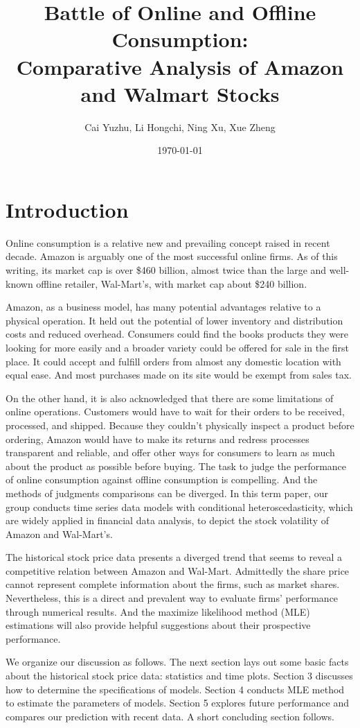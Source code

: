 \documentclass[paper=a4, fontsize=13pt]{article}
\title{
\normalfont \normalsize
\huge Battle of Online and Offline Consumption: \\
Comparative Analysis of Amazon and Walmart Stocks
}
\author{Cai Yuzhu, Li Hongchi, Ning Xu, Xue Zheng}
\date{\normalsize\today}
\begin{document}
\maketitle
\section{Introduction}
Online consumption is a relative new and prevailing concept raised in recent decade. Amazon is arguably one of the most successful online firms. As of this writing, its market cap is over \$460 billion, almost twice than the large and well-known offline retailer, Wal-Mart's, with market cap about \$240 billion.

Amazon, as a business model, has many potential advantages relative to a physical operation. It held out the potential of lower inventory and distribution costs and reduced overhead. Consumers could find the books products they were looking for more easily and a broader variety could be offered for sale in the first place. It could accept and fulfill orders from almost any domestic location with equal ease. And most purchases made on its site would be exempt from sales tax.

On the other hand, it is also acknowledged that there are some limitations of online operations. Customers would have to wait for their orders to be received, processed, and shipped. Because they couldn't physically inspect a product before ordering, Amazon would have to make its returns and redress processes transparent and reliable, and offer other ways for consumers to learn as much about the product as possible before buying.
The task to judge the performance of online consumption against offline consumption is compelling. And the methods of judgments comparisons can be diverged. In this term paper, our group conducts time series data models with conditional heteroscedasticity, which are widely applied in financial data analysis, to depict the stock volatility of Amazon and Wal-Mart's.

The historical stock price data presents a diverged trend that seems to reveal a competitive relation between Amazon and Wal-Mart. Admittedly the share price cannot represent complete information about the firms, such as market shares. Nevertheless, this is a direct and prevalent way to evaluate firms' performance through numerical results. And the maximize likelihood method (MLE) estimations will also provide helpful suggestions about their prospective performance.

We organize our discussion as follows. The next section lays out some basic facts about the historical stock price data: statistics and time plots. Section 3 discusses how to determine the specifications of models. Section 4 conducts MLE method to estimate the parameters of models. Section 5 explores future performance and compares our prediction with recent data. A short concluding section follows.
\end{document}
